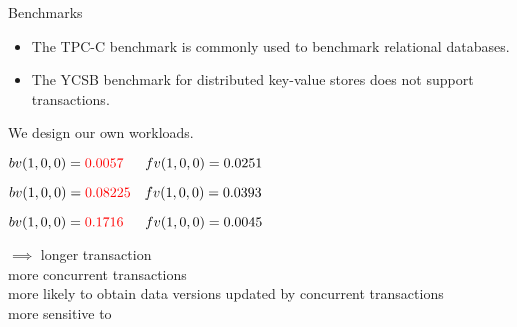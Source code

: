\begin{frame}{Benchmarks}
  \begin{itemize}
    \item The TPC-C benchmark is commonly used to benchmark relational databases.
    \item The YCSB benchmark  for distributed key-value stores
      does not support transactions.
  \end{itemize}

  \vspace{0.60cm}
  \centerline{We design our own workloads.}
\end{frame}

\begin{frame}{}
\end{frame}

\begin{frame}{}
  \begin{description}[issueDelay = 20ms:]
    \setlength{\itemsep}{10pt}
    \item[issueDelay = 20ms:] $bv(1,0,0) = \textcolor{red}{0.0057} \quad\;\; fv(1,0,0) = 0.0251$
    \item[issueDelay = 15ms:] $bv(1,0,0) = \textcolor{red}{0.08225} \quad fv(1,0,0) = 0.0393$
    \item[issueDelay = 5ms:] $bv(1,0,0) = \textcolor{red}{0.1716} \quad\;\; fv(1,0,0) = 0.0045$
  \end{description}

  \pause
  \vspace{0.50cm}
  \begin{center}
     $\implies$ longer transaction \\[5pt]
    more concurrent transactions \\[5pt]
    more likely to obtain data versions updated by concurrent transactions \\[5pt]
    more sensitive to \blue{$\ktwofv$}
  \end{center}
\end{frame}

